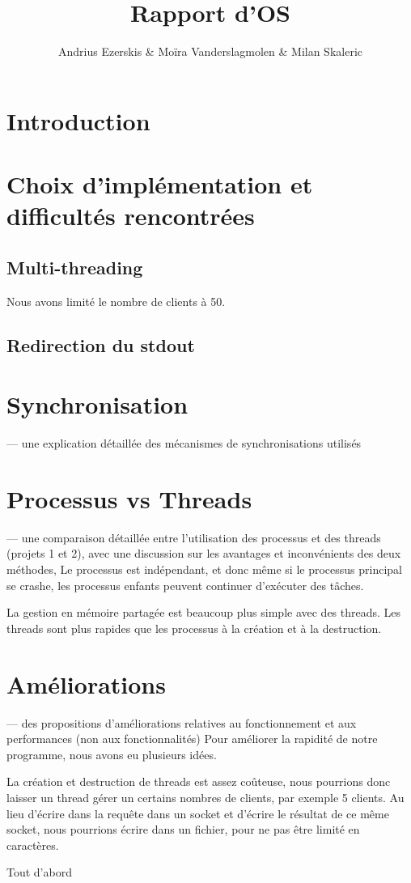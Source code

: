 \documentclass[utf8]{article}
\begin{document}
\begin{titlepage}
    

\author{Andrius Ezerskis \& Moïra Vanderslagmolen \& Milan Skaleric}
\title{Rapport d'OS}

\maketitle
\end{titlepage}

\section{Introduction}
\par
\section{Choix d'implémentation et difficultés rencontrées}
\subsection{Multi-threading}
Nous avons limité le nombre de clients à 50.

\subsection{Redirection du stdout}

\section{Synchronisation}
— une explication détaillée des mécanismes de synchronisations utilisés
\section{Processus vs Threads}
— une comparaison détaillée entre l’utilisation des processus et des threads (projets 1 et 2),
avec une discussion sur les avantages et inconvénients des deux méthodes,
Le processus est indépendant, et donc même si le processus principal se crashe, les processus enfants peuvent continuer d'exécuter des tâches.

La gestion en mémoire partagée est beaucoup plus simple avec des threads.
Les threads sont plus rapides que les processus à la création et à la destruction.
\section{Améliorations}
— des propositions d’améliorations relatives au fonctionnement et aux performances (non
aux fonctionnalités)
Pour améliorer la rapidité de notre programme, nous avons eu plusieurs idées.

La création et destruction de threads est assez coûteuse, nous pourrions donc laisser un thread gérer un certains nombres de clients, par exemple 5 clients.
Au lieu d'écrire dans la requête dans un socket et d'écrire le résultat de ce même socket, nous pourrions écrire dans un fichier, pour ne pas être limité en caractères.

Tout d'abord
\end{document}
